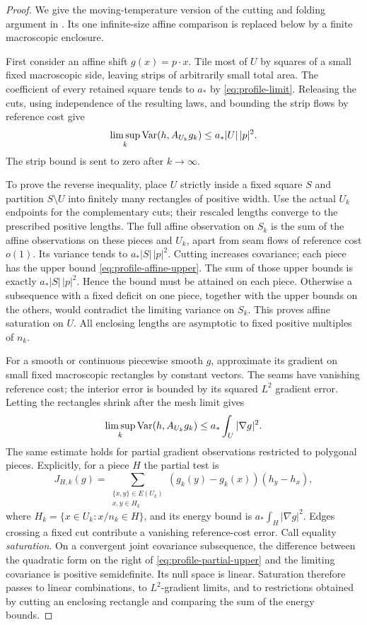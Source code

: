\begin{proof}
We give the moving-temperature version of the cutting and folding
argument in \cite[Theorem~2.4]{X}. Its one
infinite-size affine comparison is replaced below by a finite
macroscopic enclosure.

First consider an affine shift $g(x)=p\cdot x$. Tile most of $U$ by
squares of a small fixed macroscopic side, leaving strips of
arbitrarily small total area. The coefficient of every retained
square tends to $a_*$ by \eqref{eq:profile-limit}. Releasing the cuts,
using independence of the resulting laws, and bounding the strip
flows by reference cost give
\begin{equation}\label{eq:profile-affine-upper}
 \limsup_k\operatorname{Var}(h,A_{U_k}g_k)\le a_*|U|\,|p|^2.
\end{equation}
The strip bound is sent to zero after $k\to\infty$.

To prove the reverse inequality, place $U$ strictly inside a fixed
square $S$ and partition $S\setminus U$ into finitely many rectangles
of positive width. Use the actual $U_k$ endpoints for the complementary cuts; their
rescaled lengths converge to the prescribed positive lengths.
The full affine observation on $S_k$ is the sum of the affine
observations on these pieces and $U_k$, apart from seam flows of
reference cost $o(1)$. Its variance tends to $a_*|S|\,|p|^2$.
Cutting increases covariance; each piece has the upper bound
\eqref{eq:profile-affine-upper}. The sum of those upper bounds is
exactly $a_*|S|\,|p|^2$. Hence the bound must be attained on each
piece. Otherwise a subsequence with a fixed deficit on one piece,
together with the upper bounds on the others, would contradict the
limiting variance on $S_k$. This proves affine saturation on $U$.
All enclosing lengths are asymptotic to fixed positive multiples of $n_k$.

For a smooth or continuous piecewise smooth $g$, approximate its
gradient on small fixed macroscopic rectangles by constant vectors.
The seams have vanishing reference cost; the interior error is bounded
by its squared $L^2$ gradient error. Letting the rectangles shrink
after the mesh limit gives
\begin{equation}\label{eq:profile-partial-upper}
 \limsup_k\operatorname{Var}(h,A_{U_k}g_k)\le a_*\int_U|\nabla g|^2.
\end{equation}
The same estimate holds for partial gradient observations restricted
to polygonal pieces. Explicitly, for a piece $H$ the partial test is
\[
 J_{H,k}(g)=\sum_{\substack{\{x,y\}\in E(U_k)\\x,y\in H_k}}
              (g_k(y)-g_k(x))(h_y-h_x),
\]
where $H_k=\{x\in U_k:x/n_k\in H\}$, and its energy bound is
$a_*\int_H|\nabla g|^2$. Edges crossing a
fixed cut contribute a vanishing reference-cost error.
Call equality \emph{saturation}. On a convergent
joint covariance subsequence, the difference between the quadratic
form on the right of \eqref{eq:profile-partial-upper} and the limiting
covariance is positive semidefinite. Its null space is linear.
Saturation therefore passes to linear combinations, to
$L^2$-gradient limits, and to restrictions obtained by cutting an
enclosing rectangle and comparing the sum of the energy bounds.


\end{proof}
